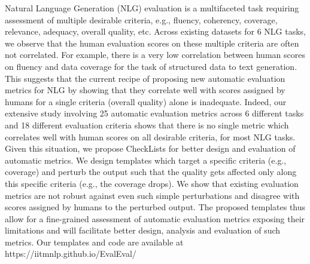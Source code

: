 Natural Language Generation (NLG) evaluation is a multifaceted task requiring assessment of multiple desirable criteria, e.g., fluency, coherency, coverage, relevance, adequacy, overall quality, etc. Across existing datasets for 6 NLG tasks, we observe that the human evaluation scores on these multiple criteria are often not correlated. For example, there is a very low correlation between human scores on fluency and data coverage for the task of structured data to text generation. This suggests that the current recipe of proposing new automatic evaluation metrics for NLG by showing that they correlate well with scores assigned by humans for a single criteria (overall quality) alone is inadequate. Indeed, our extensive study involving 25 automatic evaluation metrics across 6 different tasks and 18 different evaluation criteria shows that there is no single metric which correlates well with human scores on all desirable criteria, for most NLG tasks. Given this situation, we propose CheckLists for better design and evaluation of automatic metrics. We design templates which target a specific criteria (e.g., coverage) and perturb the output such that the quality gets affected only along this specific criteria (e.g., the coverage drops). We show that existing evaluation metrics are not robust against even such simple perturbations and disagree with scores assigned by humans to the perturbed output. The proposed templates thus allow for a fine-grained assessment of automatic evaluation metrics exposing their limitations and will facilitate better design, analysis and evaluation of such metrics. Our templates and code are available at https://iitmnlp.github.io/EvalEval/
